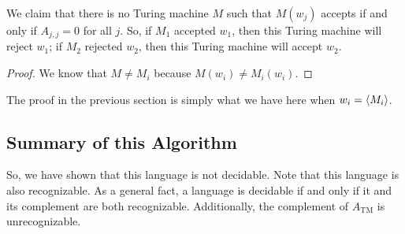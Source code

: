 \documentclass[letterpaper]{article}
\begin{document}
We claim that there is no Turing machine $M$ such that $M(w_j)$ accepts if and only if $A_{j, j} = 0$ for all $j$. So, if $M_1$ accepted $w_1$, then this Turing machine will reject $w_1$; if $M_2$ rejected $w_2$, then this Turing machine will accept $w_2$. 

\begin{mdframed}[]
    \begin{proof}
        We know that $M \neq M_i$ because $M(w_i) \neq M_{i}(w_i)$.
    \end{proof}
\end{mdframed}
The proof in the previous section is simply what we have here when $w_i = \langle M_i \rangle$. 

\subsection{Summary of this Algorithm}
So, we have shown that this language is not decidable. Note that this language is also recognizable. As a general fact, a language is decidable if and only if it and its complement are both recognizable. Additionally, the complement of $A_{\text{TM}}$ is unrecognizable. 









































\newpage 
\end{document}

